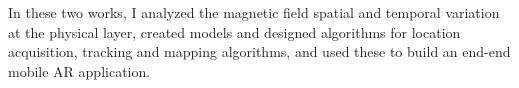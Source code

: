 \documentclass[10pt]{article}
\begin{document}
In these two works, I analyzed the magnetic field spatial and temporal variation at the physical layer, created models and designed algorithms for location acquisition, tracking and mapping algorithms, and used these to build an end-end mobile AR application. 






\end{document}
